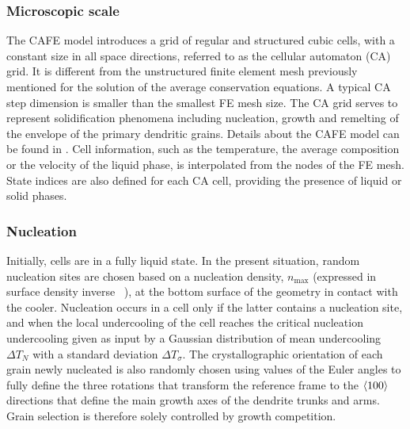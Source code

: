 \subsubsection{Microscopic scale}
The CAFE model introduces a grid of regular and structured cubic cells, with a constant size 
in all space directions, referred to as the cellular automaton (CA) grid. It is different from 
the unstructured finite element mesh previously mentioned for the solution of the average conservation 
equations. A typical CA step dimension is smaller than the smallest FE mesh size. The CA grid serves to 
represent solidification phenomena including nucleation, growth and remelting of the envelope of the 
primary dendritic grains. Details about the CAFE model can be found in \citep{carozzani_3d_2012,carozzani_direct_2013,carozzani_optimized_2014}. 
Cell information, such as the temperature, the average composition or the velocity of the liquid phase, is interpolated from 
the nodes of the FE mesh. State indices are also defined for each CA cell, providing the presence of liquid or solid phases. 
%
\subsubsection{Nucleation}
Initially, cells are in a fully liquid state. In the present situation, random nucleation sites are 
chosen based on a nucleation density, $n_\text{max}$ (expressed in surface density inverse \si{\per \uarea}), at the 
bottom surface of the geometry in contact with the cooler. Nucleation occurs in a cell only if the 
latter contains a nucleation site, and when the local undercooling of the cell reaches the critical 
nucleation undercooling given as input by a Gaussian distribution of mean undercooling $\Delta T_N$ with a 
standard deviation $\Delta T_\sigma$. The crystallographic orientation of each grain newly nucleated is also randomly 
chosen using values of the Euler angles to fully define the three rotations that transform the reference 
frame to the $\langle 100 \rangle$ directions that define the main growth axes of the dendrite trunks and arms. Grain 
selection is therefore solely controlled by growth competition.
%
